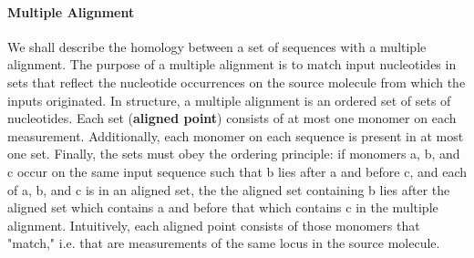 \documentclass[11pt]{article}
\begin{document}


\paragraph{\newline Multiple Alignment\newline}


\par{
We shall describe the homology between a set of sequences with a multiple alignment.  The purpose of a multiple alignment is to match input nucleotides in sets that reflect the nucleotide occurrences on the source molecule from which the inputs originated.  In structure, a multiple alignment is an ordered set of sets of nucleotides. Each set (\textbf{aligned point}) consists of at most one monomer on each measurement.  Additionally, each monomer on each sequence is present in at most one set. Finally, the sets must obey the ordering principle: if monomers a, b, and c occur on the same input sequence such that b lies after a and before c, and each of a, b, and c is in an aligned set, the the aligned set containing b lies after the aligned set which contains a and before that which contains c in the multiple alignment.  Intuitively, each aligned point consists of those monomers that "match," i.e. that are measurements of the same locus in the source molecule.
}
\end{document}
